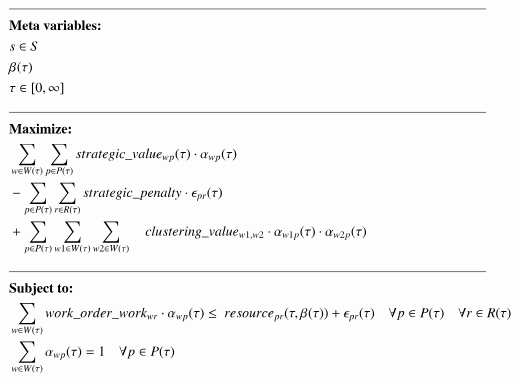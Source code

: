 
\newpage
\begin{alignat}{2}
	& \text{\rule{\linewidth}{0.4pt}} \notag\\
	& \textbf{Meta variables:} \notag\\
	& \ElementScheduler \in \SetScheduler \\
	& \VarTacticalWork{}{} \\ 
	& \tau \in [0, \infty] \\
	& \text{\rule{\linewidth}{0.4pt}} \notag\\
	& \textbf{Maximize:} \notag                                                                                                                                                        \\
	& \sum_{\ElementWorkOrder \in \SetWorkOrder{}} \sum_{\ElementPeriod \in \SetPeriod} \ParStrategicValue \cdot \VarStrategicWorkOrderAssignment{\ElementWorkOrder}{\ElementPeriod}  \notag\\ 
	& - \sum_{\ElementPeriod \in \SetPeriod} \sum_{\ElementResource \in \SetResource} \ParStrategicPenalty \cdot \VarStrategicExcess     \notag                                              \\
	& + \sum_{\ElementPeriod \in \SetPeriod} \sum_{\ElementWorkOrder1 \in \SetWorkOrder{}} \sum_{\ElementWorkOrder2 \in \SetWorkOrder{}} 	 \quad \ParClusteringValue \cdot \VarStrategicWorkOrderAssignment{\ElementWorkOrder1}{\ElementPeriod} \cdot \VarStrategicWorkOrderAssignment{\ElementWorkOrder2}{\ElementPeriod}  \\
	& \text{\rule{\linewidth}{0.4pt}} \notag\\
	& \textbf{Subject to:} \notag                                                                                                                                                      \\
	& \sum_{\ElementWorkOrder \in \SetWorkOrder{}} \ParStrategicWorkOrderWeight \cdot \VarStrategicWorkOrderAssignment{\ElementWorkOrder}{\ElementPeriod} \leq \ \ParStrategicResource + \VarStrategicExcess                                                                           \quad \forall \ElementPeriod \in \SetPeriod \quad \forall \ElementResource \in \SetResource                                                                                      \\
	& \sum_{\ElementWorkOrder \in \SetWorkOrder{}} \VarStrategicWorkOrderAssignment{\ElementWorkOrder}{\ElementPeriod} = 1              \quad \forall \ElementPeriod \in \SetPeriod                                                                                                                                      \\

\end{alignat}
